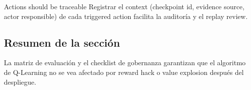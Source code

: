 \begin{knowledgebox}{Actions should be traceable}
Registrar el context (checkpoint id, evidence source, actor responsible) de cada triggered action facilita la auditoría y el replay review.
\end{knowledgebox}

\subsection{Resumen de la sección}

La matriz de evaluación y el checklist de gobernanza garantizan que el algoritmo de Q-Learning no se vea afectado por reward hack o value explosion después del despliegue.
